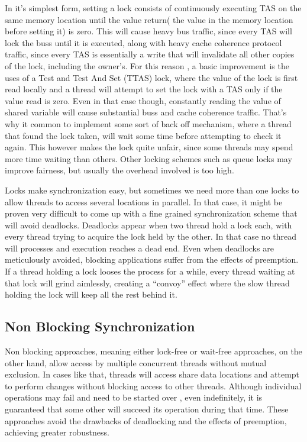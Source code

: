 In it's simplest form, setting a lock consists of  continuously executing TAS on the same memory location until the value return( the value in the memory location before setting it) is zero. This will cause heavy bus traffic, since every TAS will lock the buss until it is executed, along with heavy cache coherence protocol traffic, since every TAS is essentially a write that will invalidate all other copies of the lock, including the owner's. For this reason , a basic improvement is the uses of a Test and Test And Set (TTAS) lock, where the value of the lock is first read locally and a thread will attempt to set the lock with a TAS only if the value read is zero. Even in that case though, constantly reading the value of shared variable will cause substantial buss and cache coherence traffic. That's why it common to implement some sort of back off mechanism, where a thread that found the lock taken, will wait some time before attempting to check it again. This however makes the lock quite unfair, since some threads may spend more time waiting than others. Other locking schemes such as queue locks may improve fairness, but usually the overhead involved is too high.

Locks make synchronization easy, but sometimes we need more than one locks to allow threads to access several locations in parallel. In that case, it might be proven very difficult to come up with a fine grained synchronization scheme that will avoid deadlocks. Deadlocks appear when two thread hold a lock each, with every thread trying to acquire the lock held by the other. In that case no thread will processes and execution reaches a dead end. Even when deadlocks are meticulously avoided, blocking applications suffer from  the effects of preemption. If a thread holding a lock looses the process for a while, every thread waiting at that lock will grind aimlessly, creating a “convoy” effect where the slow thread holding the lock will keep all the rest behind it.

\subsection{Non Blocking Synchronization}

Non blocking approaches, meaning either lock-free or wait-free approaches, on the other hand, allow access by multiple concurrent threads without mutual exclusion. In cases like that, threads will access share data locations and attempt to perform changes without blocking access to other threads. Although individual operations may fail and need to be started over , even indefinitely, it is guaranteed that some other will succeed its operation during that time. These approaches avoid the drawbacks of deadlocking and the effects of preemption, achieving greater robustness.

